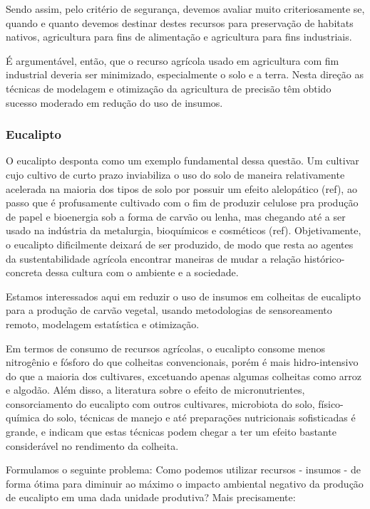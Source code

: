 \documentclass[14pt,a4paper]{article}
\begin{document}
		Sendo assim, pelo critério de segurança, devemos avaliar muito criteriosamente se, quando e quanto devemos destinar destes recursos para preservação de habitats nativos, agricultura para fins de alimentação e agricultura para fins industriais. 
		
		É argumentável, então, que o recurso agrícola usado em agricultura com fim industrial deveria ser minimizado, especialmente o solo e a terra. Nesta direção as técnicas de modelagem e otimização da agricultura de precisão têm obtido sucesso moderado em redução do uso de insumos. 
		
	\subsubsection{Eucalipto}
		
		O eucalipto desponta como um exemplo fundamental dessa questão. Um cultivar cujo cultivo de curto prazo inviabiliza o uso do solo de maneira relativamente acelerada na maioria dos tipos de solo por possuir um efeito alelopático (ref), ao passo que é profusamente cultivado com o fim de produzir celulose pra produção de papel e bioenergia sob a forma de carvão ou lenha, mas chegando até a ser usado na indústria da metalurgia, bioquímicos e cosméticos (ref). Objetivamente, o eucalipto dificilmente deixará de ser produzido, de modo que resta ao agentes da sustentabilidade agrícola encontrar maneiras de mudar a relação histórico-concreta dessa cultura com o ambiente e a sociedade. 
		
		Estamos interessados aqui em reduzir o uso de insumos em colheitas de eucalipto para a produção de carvão vegetal, usando metodologias de sensoreamento remoto, modelagem estatística e otimização.  
		 
		Em termos de consumo de recursos agrícolas, o eucalipto consome menos nitrogênio e fósforo do que colheitas convencionais, porém é mais hidro-intensivo do que a maioria dos cultivares, excetuando apenas algumas colheitas como arroz e algodão. Além disso, a literatura sobre o efeito de micronutrientes, consorciamento do eucalipto com outros cultivares, microbiota do solo, físico-química do solo, técnicas de manejo e até preparações nutricionais sofisticadas é grande, e indicam que estas técnicas podem chegar a ter um efeito bastante considerável no rendimento da colheita. 
		
		Formulamos o seguinte problema: Como podemos utilizar recursos - insumos - de forma ótima para diminuir ao máximo o impacto ambiental negativo da produção de eucalipto em uma dada unidade produtiva? Mais precisamente:
		
\end{document}
